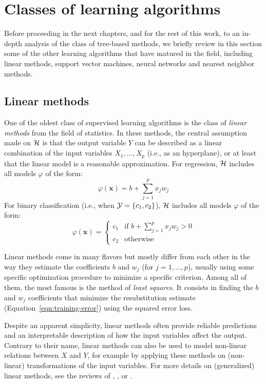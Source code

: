 \section{Classes of learning algorithms}
\label{sec:2:classes-of-algorithms}

Before proceeding in the next chapters, and for the rest of
this work, to an in-depth analysis of the class of tree-based methods,  we
briefly review in this section some of the other learning algorithms that have
matured in the field, including linear methods, support vector machines, neural networks and nearest
neighbor methods.

\subsection{Linear methods}

One of the oldest class of supervised learning algorithms is the class of
\textit{linear methods} from the field of statistics. In these methods, the central
assumption made on ${\cal H}$ is that the output variable $Y$ can be described
as a linear combination of the input variables $X_1, ..., X_p$ (i.e., as an hyperplane), or at least
that the linear model is a reasonable approximation. For regression, ${\cal H}$
includes all models $\varphi$ of the form:
\begin{equation}
\varphi(\mathbf{x}) = b + \sum_{j=1}^p x_j w_j
\end{equation}
For binary classification (i.e., when ${\cal Y}=\{c_1, c_2\}$),  ${\cal H}$ includes all
models $\varphi$ of the form:
\begin{equation}\label{eqn:linear-model}
\varphi(\mathbf{x}) = \begin{cases}
c_1 & \text{if } b + \sum_{j=1}^p x_j w_j > 0\\
c_2 & \text{otherwise}
\end{cases}
\end{equation}

Linear methods come in many flavors but mostly differ from each other in the
way they estimate the coefficients $b$ and $w_j$ (for $j=1,\dots,p$), usually using some specific
optimization procedure to minimize a specific criterion. Among all of them, the
most famous is the method of \textit{least squares}. It consists in finding the
$b$ and $w_j$ coefficients that minimize the resubstitution estimate
(Equation~\ref{eqn:training-error}) using the squared error loss.

Despite an apparent simplicity, linear methods often provide reliable
predictions and an interpretable description of how the input variables affect
the output. Contrary to their name, linear methods can also be used to model
non-linear relations between $X$ and $Y$, for example by applying these methods
on (non-linear) transformations of the input variables. For more details on
(generalized) linear methods, see the reviews of \citet{maccullagh:1989},
\citet{hastie:2005}, \citet{bishop:2006} or \citet{duda:2012}.


